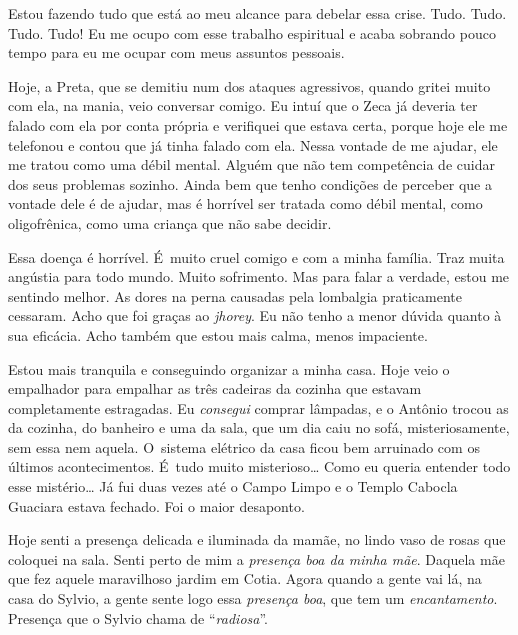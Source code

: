 Estou fazendo tudo que está ao meu alcance para debelar essa crise.
Tudo. Tudo. Tudo. Tudo! Eu me ocupo com esse trabalho espiritual e acaba
sobrando pouco tempo para eu me ocupar com meus assuntos pessoais.

Hoje, a Preta, que se demitiu num dos ataques agressivos, quando gritei
muito com ela, na mania, veio conversar comigo. Eu intuí que o Zeca já
deveria ter falado com ela por conta própria e verifiquei que estava
certa, porque hoje ele me telefonou e contou que já tinha falado com
ela. Nessa vontade de me ajudar, ele me tratou como uma débil mental.
Alguém que não tem competência de cuidar dos seus problemas sozinho.
Ainda bem que tenho condições de perceber que a vontade dele é de
ajudar, mas é horrível ser tratada como débil mental, como oligofrênica,
como uma criança que não sabe decidir.

Essa doença é horrível. É~muito cruel comigo e com a minha família. Traz
muita angústia para todo mundo. Muito sofrimento. Mas para falar a
verdade, estou me sentindo melhor. As dores na perna causadas pela
lombalgia praticamente cessaram. Acho que foi graças ao \emph{jhorey}.
Eu não tenho a menor dúvida quanto à sua eficácia. Acho também que estou
mais calma, menos impaciente.

Estou mais tranquila e conseguindo organizar a minha casa. Hoje veio o
empalhador para empalhar as três cadeiras da cozinha que estavam
completamente estragadas. Eu \emph{consegui} comprar lâmpadas, e o
Antônio trocou as da cozinha, do banheiro e uma da sala, que um dia caiu
no sofá, misteriosamente, sem essa nem aquela. O~sistema elétrico da
casa ficou bem arruinado com os últimos acontecimentos. É~tudo muito
misterioso… Como eu queria entender todo esse mistério… Já
fui duas vezes até o Campo Limpo e o Templo Cabocla Guaciara estava
fechado. Foi o maior desaponto.

Hoje senti a presença delicada e iluminada da mamãe, no lindo vaso de
rosas que coloquei na sala. Senti perto de mim a \emph{presença boa da
minha mãe}. Daquela mãe que fez aquele maravilhoso jardim em Cotia.
Agora quando a gente vai lá, na casa do Sylvio, a gente sente logo essa
\emph{presença boa}, que tem um \emph{encantamento}. Presença que o
Sylvio chama de ``\emph{radiosa}''.

\begin{center}\asterisc{}​\end{center}

\begin{flushright}\textbf{}\end{flushright}

